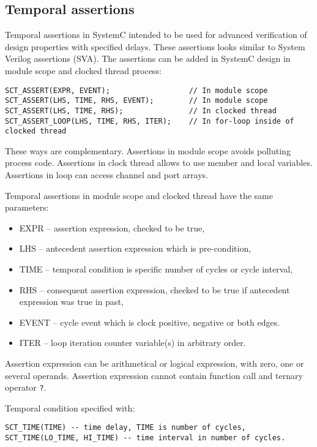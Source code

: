 \subsection{Temporal assertions}

Temporal assertions in SystemC intended to be used for advanced verification of design properties with specified delays. These assertions looks similar to System Verilog assertions (SVA). The assertions can be added in SystemC design in module scope and clocked thread process:

\begin{lstlisting}[style=mycpp]
SCT_ASSERT(EXPR, EVENT);                  // In module scope 
SCT_ASSERT(LHS, TIME, RHS, EVENT);        // In module scope 
SCT_ASSERT(LHS, TIME, RHS);               // In clocked thread 
SCT_ASSERT_LOOP(LHS, TIME, RHS, ITER);    // In for-loop inside of clocked thread
\end{lstlisting}

These ways are complementary. Assertions in module scope avoids polluting process code. Assertions in clock thread allows to use member and local variables. Assertions in loop can access channel and port arrays.

Temporal assertions in module scope and clocked thread have the same parameters:
\begin{itemize}
\item EXPR -- assertion expression, checked to be true,
\item LHS -- antecedent assertion expression which is pre-condition, 
\item TIME -- temporal condition is specific number of cycles or cycle interval,
\item RHS -- consequent assertion expression, checked to be true if antecedent expression was true in past,
\item EVENT -- cycle event which is clock positive, negative or both edges.
\item ITER -- loop iteration counter variable(s) in arbitrary order.
\end{itemize}
Assertion expression can be arithmetical or logical expression, with zero, one or several operands. Assertion expression cannot contain function call and ternary operator {\tt ?}.

Temporal condition specified with:
\begin{lstlisting}[style=mycpp]
SCT_TIME(TIME) -- time delay, TIME is number of cycles,
SCT_TIME(LO_TIME, HI_TIME) -- time interval in number of cycles.
\end{lstlisting}


